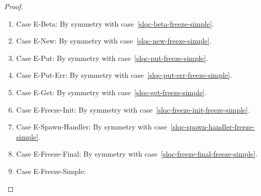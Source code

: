 \begin{proof}
\begin{enumerate}
    \begin{enumerate}
    \item \label{slqc-freeze-simple-beta}Case {\sc E-Beta}: By symmetry with case~\ref{slqc-beta-freeze-simple}.
    \item \label{slqc-freeze-simple-new}Case {\sc E-New}: By symmetry with case~\ref{slqc-new-freeze-simple}.
    \item \label{slqc-freeze-simple-put}Case {\sc E-Put}: By symmetry with case~\ref{slqc-put-freeze-simple}.
    \item \label{slqc-freeze-simple-put-err}Case {\sc E-Put-Err}: By symmetry with case~\ref{slqc-put-err-freeze-simple}.
    \item \label{slqc-freeze-simple-get}Case {\sc E-Get}: By symmetry with case~\ref{slqc-get-freeze-simple}.
    \item \label{slqc-freeze-simple-freeze-init}Case {\sc E-Freeze-Init}: By symmetry with case~\ref{slqc-freeze-init-freeze-simple}.
    \item \label{slqc-freeze-simple-spawn-handler}Case {\sc E-Spawn-Handler}: By symmetry with case~\ref{slqc-spawn-handler-freeze-simple}.
    \item \label{slqc-freeze-simple-freeze-final}Case {\sc E-Freeze-Final}: By symmetry with case~\ref{slqc-freeze-final-freeze-simple}.
    \item \label{slqc-freeze-simple-freeze-simple}Case {\sc E-Freeze-Simple}: \TODO{}
    \end{enumerate}

  \end{enumerate}
\end{proof}

